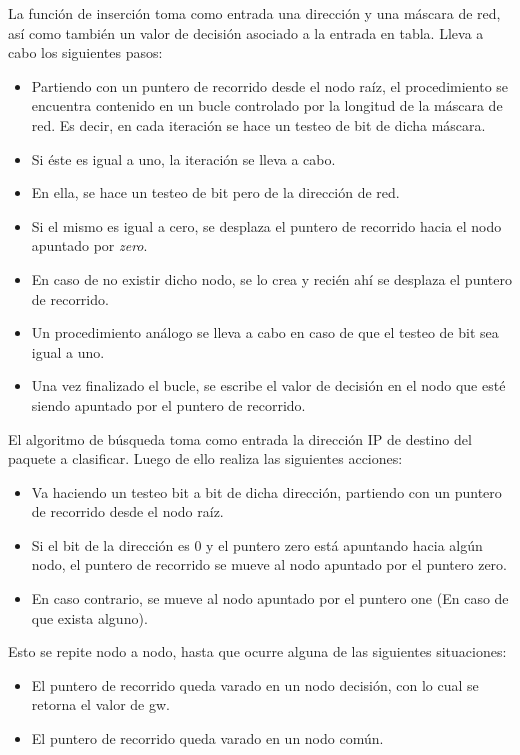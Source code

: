 La función de inserción toma como entrada una dirección y una máscara de red, así como también un valor de decisión asociado a la entrada en tabla. Lleva a cabo los siguientes pasos:
\begin{itemize}
	\item Partiendo con un puntero de recorrido desde el nodo raíz, el procedimiento se encuentra contenido en un bucle controlado por la longitud de la máscara de red. Es decir, en cada iteración se hace un testeo de bit de dicha máscara. 
	\item Si éste es igual a uno, la iteración se lleva a cabo.
	\item En ella, se hace un testeo de bit pero de la dirección de red.
	\item Si el mismo es igual a cero, se desplaza el puntero de recorrido hacia el nodo apuntado por \textit{zero}.
	\item En caso de no existir dicho nodo, se lo crea y recién ahí se desplaza el puntero de recorrido.
	\item Un procedimiento análogo se lleva a cabo en caso de que el testeo de bit sea igual a uno.
	\item Una vez finalizado el bucle, se escribe el valor de decisión en el nodo que esté siendo apuntado por el puntero de recorrido.
\end{itemize}


El algoritmo de búsqueda toma como entrada la dirección IP de destino del paquete a clasificar. Luego de ello realiza las siguientes acciones:
\begin{itemize}
	\item Va haciendo un testeo bit a bit de dicha dirección, partiendo con un puntero de recorrido desde el nodo raíz.
	\item Si el bit de la dirección es 0 y el puntero zero está apuntando hacia algún nodo, el puntero de recorrido se mueve al nodo apuntado por el puntero zero.
	\item En caso contrario, se mueve al nodo apuntado por el puntero one (En caso de que exista alguno).
\end{itemize}

Esto se repite nodo a nodo, hasta que ocurre alguna de las siguientes situaciones:

\begin{itemize}
    	\item El puntero de recorrido queda varado en un nodo decisión, con lo cual se retorna el valor de gw.
    	\item El puntero de recorrido queda varado en un nodo común. 
\end{itemize}


